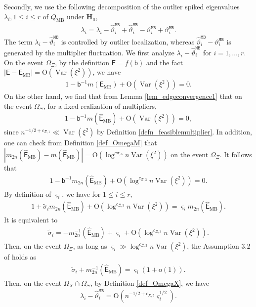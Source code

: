 \documentclass[12pt]{article}
\theoremstyle{plain}
\numberwithin{equation}{section}
\begin{document}
Secondly, we use the following decomposition of the outlier spiked eigenvalues $\lambda_i,1\le i\le r$ of $Q_{\mathrm{MB}}$ under $\mathbf{H}_a$,
\begin{align}\label{eq_power_decomp}
	\lambda_{i}=\lambda_i-\widehat{\vartheta}^{\mathtt{MB}}_i+\widehat{\vartheta}^{\mathtt{MB}}_i-\vartheta^{\mathtt{MB}}_i+\vartheta^{\mathtt{MB}}_i.
\end{align}
The term $\lambda_i-\widehat{\vartheta}_i^{\mathtt{MB}}$ is controlled by outlier localization, whereas $\widehat{\vartheta}^{\mathtt{MB}}_i-\vartheta^{\mathtt{MB}}_i$ is generated by the multiplier fluctuation. We first analyze $\lambda_i-\widehat{\vartheta}^{\mathtt{MB}}_i$ for $i=1,\dots, r$. On the event $\Omega_{\Xi}$, by the definition $\mathsf{E}=f(\mathsf{b})$ and the fact $|\mathsf{E}-\mathsf{E}_{\mathrm{MB}}|=\mathrm{O}(\operatorname{Var}(\xi^2))$, we have  
\begin{align*}
	1-\mathsf{b}^{-1}m(\mathsf{E}_{\mathrm{MB}})+\mathrm{O}(\operatorname{Var}(\xi^2))=0.
\end{align*}
On the other hand, we find that from Lemma \ref{lem_edgeconvergence1} that on the event $\Omega_{\Xi}$, for a fixed realization of multipliers,
\begin{align*}
	1-\mathsf{b}^{-1}m(\widehat{\mathsf{E}}_{\mathrm{MB}})+\mathrm{O}(\operatorname{Var}(\xi^2))=0,
\end{align*}
since $n^{-1/2+c_{\Xi,1}}\ll \operatorname{Var}(\xi^2)$ by Definition \ref{defn_feasiblemultiplier}. In addition, one can check from Definition \ref{def_OmegaM} that $|m_{2n}(\widehat{\mathsf{E}}_{\mathrm{MB}})-m(\widehat{\mathsf{E}}_{\mathrm{MB}})|=\mathrm{O}(\log^{c_{\Xi,3}}n\operatorname{Var}(\xi^2))$ on the event $\Omega_{\Xi}$. It follows that 
\begin{align*}
	1-\mathsf{b}^{-1}m_{2n}(\widehat{\mathsf{E}}_{\mathrm{MB}})+\mathrm{O}(\log^{c_{\Xi,3}}n\operatorname{Var}(\xi^2))=0.
\end{align*}
By definition of $\varsigma_i$, we have for $1\le i \le r$,
\begin{align*}
	1+\widetilde{\sigma}_im_{2n}(\widehat{\mathsf{E}}_{\mathrm{MB}})+\mathrm{O}(\log^{c_{\Xi,3}}n\operatorname{Var}(\xi^2))= \varsigma_i m_{2n}(\widehat{\mathsf{E}}_{\mathrm{MB}}).
\end{align*}
It is equivalent to
\begin{align}\label{eq_spike_condition}
	\widetilde{\sigma}_i=-m^{-1}_{2n}(\widehat{\mathsf{E}}_{\mathrm{MB}})+\varsigma_i+\mathrm{O}(\log^{c_{\Xi,3}}n\operatorname{Var}(\xi^2)).
\end{align}
Then, on the event $\Omega_{\Xi}$, as long as $\varsigma_i\gg \log^{c_{\Xi,3}}n\operatorname{Var}(\xi^2)$, the Assumption 3.2 of \cite{DingYang2021} holds as
\begin{align*}
	\widetilde{\sigma}_i+m^{-1}_{2n}(\widehat{\mathsf{E}}_{\mathrm{MB}})=\varsigma_i(1+\mathrm{o}(1)).
\end{align*}
Then, on the event $\Omega_X\cap\Omega_{\Xi}$, by Definition \ref{def_OmegaX}, we have
\begin{align}\label{eq_power_outlier_est1}
	\lambda_i-\widehat{\vartheta}_i^{\mathtt{MB}}=\mathrm{O}(n^{-1/2+c_{X,5}}\varsigma_i^{1/2}).
\end{align}
\end{document}
